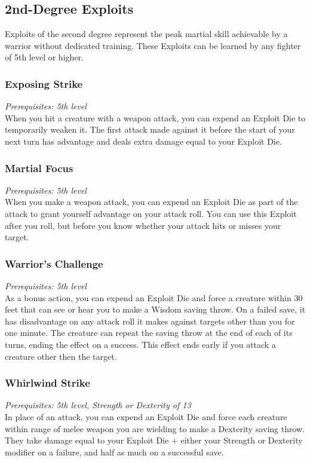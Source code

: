 \documentclass[letterpaper,justified,openany,oneside,twocolumn]{dndbook}
\begin{document}
\subsection*{2nd-Degree Exploits}
Exploits of the second degree represent the peak martial skill achievable by a warrior without dedicated training. These Exploits can be learned by any fighter of 5th level or higher.

\subsubsection*{Exposing Strike}
\textit{Prerequisites: 5th level}\\
When you hit a creature with a weapon attack, you can expend an Exploit Die to temporarily weaken it. The first attack made against it before the start of your next turn has advantage and deals extra damage equal to your Exploit Die.

\subsubsection*{Martial Focus}
\textit{Prerequisites: 5th level}\\
When you make a weapon attack, you can expend an Exploit Die as part of the attack to grant yourself advantage on your attack roll. You can use this Exploit after you roll, but before you know whether your attack hits or misses your target.

\subsubsection*{Warrior's Challenge}
\textit{Prerequisites: 5th level}\\
As a bonus action, you can expend an Exploit Die and force
a creature within 30 feet that can see or hear you to make a Wisdom saving throw. On a failed save, it has disadvantage on any attack roll it makes against targets other than you for one minute. The creature can repeat the saving throw at the end of each of its turns, ending the effect on a success. This effect ends early if you attack a creature other then the target.

\subsubsection*{Whirlwind Strike}
\textit{Prerequisites: 5th level, Strength or Dexterity of 13}\\
In place of an attack, you can expend an Exploit Die and force each creature within range of melee weapon you are wielding to make a Dexterity saving throw. They take damage equal to your Exploit Die + either your Strength or Dexterity modifier on a failure, and half as much on a successful save.
\end{document}

